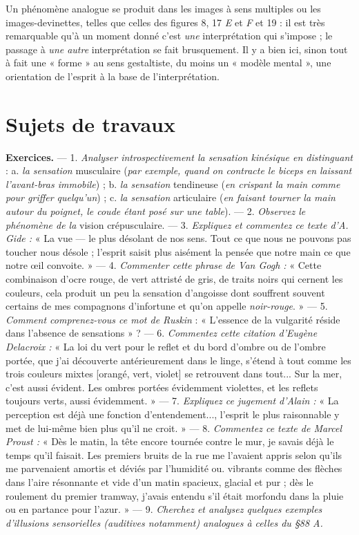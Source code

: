 Un phénomène analogue se produit dans les images à sens multiples
ou les images-devinettes, telles que celles des figures 8, 17 {\it E} et {\it F}
et 19 : il est très remarquable qu’à un moment donné c’est {\it une}
interprétation qui s'impose ; le passage à {\it une autre} interprétation
se fait brusquement. Il y a bien ici, sinon tout à fait une « forme »
au sens gestaltiste, du moins un « modèle mental », une orientation
de l'esprit à la base de l'interprétation.

\section{Sujets de travaux}%

{\bf Exercices.} — 1. {\it Analyser introspectivement la sensation kinésique en
distinguant} : a. {\it la sensation} musculaire ({\it par exemple, quand on contracte le
biceps en laissant l'avant-bras immobile}) ; b. {\it la sensation} tendineuse ({\it en
crispant la main comme pour griffer quelqu'un}) ; c. {\it la sensation} articulaire
({\it en faisant tourner la main autour du poignet, le coude étant posé sur une
table}). — 2. {\it Observez le phénomène de la} vision crépusculaire. — 3. {\it Expliquez
et commentez ce texte d'A. Gide :} « La vue — le plus désolant de nos sens.
Tout ce que nous ne pouvons pas toucher nous désole ; l'esprit saisit plus
aisément la pensée que notre main ce que notre œil convoite. » — 4. {\it Commenter
cette phrase de Van Gogh :} « Cette combinaison d'ocre rouge, de
vert attristé de gris, de traits noirs qui cernent les couleurs, cela produit
un peu la sensation d'angoisse dont souffrent souvent certains de mes
compagnons d'infortune et qu'on appelle {\it noir-rouge}. » — 5. {\it Comment
comprenez-vous ce mot de Ruskin} : « L’essence de la vulgarité réside dans
l'absence de sensations » ? — 6. {\it Commentez cette citation d’Eugène Delacroix :}
« La loi du vert pour le reflet et du bord d'ombre ou de l'ombre portée, que
j'ai découverte antérieurement dans le linge, s'étend à tout comme les
trois couleurs mixtes [orangé, vert, violet] se retrouvent dans tout... Sur
la mer, c’est aussi évident. Les ombres portées évidemment violettes,
et les reflets toujours verts, aussi évidemment. » — 7. {\it Expliquez ce jugement
d'Alain :} « La perception est déjà une fonction d’entendement..., l'esprit
le plus raisonnable y met de lui-même bien plus qu'il ne croit. » — 8. {\it Commentez
ce texte de Marcel Proust :} « Dès le matin, la tête encore tournée contre
le mur, je savais déjà le temps qu'il faisait. Les premiers bruits de la rue
me l'avaient appris selon qu’ils me parvenaient amortis et déviés par
l'humidité ou. vibrants comme des flèches dans l'aire résonnante et vide
d'un matin spacieux, glacial et pur ; dès le roulement du premier tramway,
j'avais entendu s’il était morfondu dans la pluie ou en partance pour
l'azur. » — 9. {\it Cherchez et analysez quelques exemples d'illusions sensorielles
(auditives notamment) analogues à celles du \S 88 A.}

